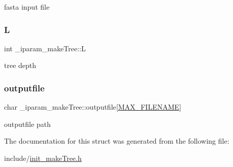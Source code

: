 fasta input file \mbox{\label{struct__iparam__makeTree_a56fd13b9cf051d4770f40b015a295fd3}} 
\subsubsection{\texorpdfstring{L}{L}}
{\footnotesize\ttfamily int \+\_\+iparam\+\_\+make\+Tree\+::L}

tree depth \mbox{\label{struct__iparam__makeTree_a9506dbea307f1fda5cc22c84bc4d035f}} 
\subsubsection{\texorpdfstring{outputfile}{outputfile}}
{\footnotesize\ttfamily char \+\_\+iparam\+\_\+make\+Tree\+::outputfile\mbox{[}\mbox{\hyperlink{defines_8h_abe0ec333b60117063f9b9fd9f849cb08}{M\+A\+X\+\_\+\+F\+I\+L\+E\+N\+A\+ME}}\mbox{]}}

outputfile path 

The documentation for this struct was generated from the following file\+:\begin{DoxyCompactItemize}
\item 
include/\mbox{\hyperlink{init__makeTree_8h}{init\+\_\+make\+Tree.\+h}}\end{DoxyCompactItemize}
